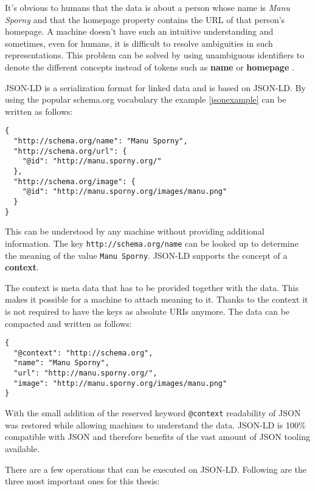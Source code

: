 It's obvious to humans that the data is about a person whose name is \textit{Manu Sporny} and that the homepage property contains the URL of that person's homepage. A machine doesn't have such an intuitive understanding and sometimes, even for humans, it is difficult to resolve ambiguities in such representations. This problem can be solved by using unambiguous identifiers to denote the different concepts instead of tokens such as \textbf{name} or \textbf{homepage} \citep{jsonldbasicconcepts}.

JSON-LD is a serialization format for linked data and is based on JSON-LD. By using the popular schema.org vocabulary the example \ref{jsonexample} can be written as follows:

\lstset{language=JSON}
\begin{lstlisting}[caption=Data of a person in the JSON-LD format, label=jsonldexample]
{
  "http://schema.org/name": "Manu Sporny",
  "http://schema.org/url": {
    "@id": "http://manu.sporny.org/"
  },
  "http://schema.org/image": {
    "@id": "http://manu.sporny.org/images/manu.png"
  }
}
\end{lstlisting}

This can be understood by any machine without providing additional information. The key \lstinline{http://schema.org/name} can be looked up to determine the meaning of the value \lstinline{Manu Sporny}. JSON-LD supports the concept of a \textbf{context}.

The context is meta data that has to be provided together with the data. This makes it possible for a machine to attach meaning to it. Thanks to the context it is not required to have the keys as absolute URIs anymore. The data can be compacted and written as follows:

\lstset{language=JSON}
\begin{lstlisting}[caption=Compacted data of a person, label=jsonldcompacted]
{
  "@context": "http://schema.org",
  "name": "Manu Sporny",
  "url": "http://manu.sporny.org/",
  "image": "http://manu.sporny.org/images/manu.png"
}
\end{lstlisting}

With the small addition of the reserved keyword \lstinline{@context} readability of JSON was restored while allowing machines to understand the data. JSON-LD is 100\% compatible with JSON and therefore benefits of the vast amount of JSON tooling available.

There are a few operations that can be executed on JSON-LD. Following are the three most important ones for this thesis:

